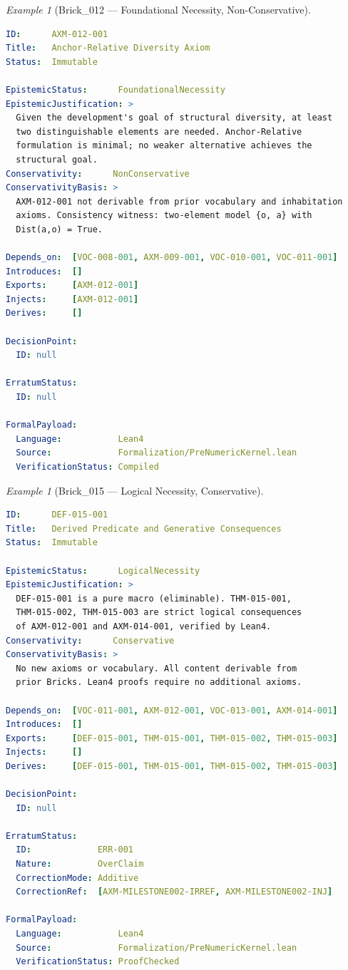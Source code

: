 \documentclass[12pt, a4paper]{article}
\theoremstyle{plain}
\theoremstyle{definition}
\theoremstyle{remark}
\newtheorem{example}[theorem]{Example}
\begin{document}
\begin{example}[Brick\_012 --- Foundational Necessity, Non-Conservative]
\label{ex:brick012}
\begin{lstlisting}[language=yaml]
ID:      AXM-012-001
Title:   Anchor-Relative Diversity Axiom
Status:  Immutable

EpistemicStatus:      FoundationalNecessity
EpistemicJustification: >
  Given the development's goal of structural diversity, at least
  two distinguishable elements are needed. Anchor-Relative
  formulation is minimal; no weaker alternative achieves the
  structural goal.
Conservativity:      NonConservative
ConservativityBasis: >
  AXM-012-001 not derivable from prior vocabulary and inhabitation
  axioms. Consistency witness: two-element model {o, a} with
  Dist(a,o) = True.

Depends_on:  [VOC-008-001, AXM-009-001, VOC-010-001, VOC-011-001]
Introduces:  []
Exports:     [AXM-012-001]
Injects:     [AXM-012-001]
Derives:     []

DecisionPoint:
  ID: null

ErratumStatus:
  ID: null

FormalPayload:
  Language:           Lean4
  Source:             Formalization/PreNumericKernel.lean
  VerificationStatus: Compiled
\end{lstlisting}
\end{example}

\begin{example}[Brick\_015 --- Logical Necessity, Conservative]
\label{ex:brick015}
\begin{lstlisting}[language=yaml]
ID:      DEF-015-001
Title:   Derived Predicate and Generative Consequences
Status:  Immutable

EpistemicStatus:      LogicalNecessity
EpistemicJustification: >
  DEF-015-001 is a pure macro (eliminable). THM-015-001,
  THM-015-002, THM-015-003 are strict logical consequences
  of AXM-012-001 and AXM-014-001, verified by Lean4.
Conservativity:      Conservative
ConservativityBasis: >
  No new axioms or vocabulary. All content derivable from
  prior Bricks. Lean4 proofs require no additional axioms.

Depends_on:  [VOC-011-001, AXM-012-001, VOC-013-001, AXM-014-001]
Introduces:  []
Exports:     [DEF-015-001, THM-015-001, THM-015-002, THM-015-003]
Injects:     []
Derives:     [DEF-015-001, THM-015-001, THM-015-002, THM-015-003]

DecisionPoint:
  ID: null

ErratumStatus:
  ID:             ERR-001
  Nature:         OverClaim
  CorrectionMode: Additive
  CorrectionRef:  [AXM-MILESTONE002-IRREF, AXM-MILESTONE002-INJ]

FormalPayload:
  Language:           Lean4
  Source:             Formalization/PreNumericKernel.lean
  VerificationStatus: ProofChecked
\end{lstlisting}
\end{example}
\end{document}
